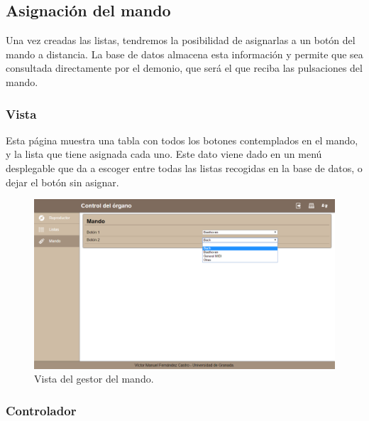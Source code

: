 \smallskip

\subsection{Asignación del mando}

Una vez creadas las listas, tendremos la posibilidad de asignarlas a un botón del mando a distancia. La base de datos almacena esta información y permite que sea consultada directamente por el demonio, que será el que reciba las pulsaciones del mando.

\subsubsection{Vista}

Esta página muestra una tabla con todos los botones contemplados en el mando, y la lista que tiene asignada cada uno. Este dato viene dado en un menú desplegable que da a escoger entre todas las listas recogidas en la base de datos, o dejar el botón sin asignar.

\smallskip

\begin{figure}[H]
	\noindent \begin{centering}
		\includegraphics[width=\linewidth*3/4]{capitulo5/cap_mando}
		\par\end{centering}
	\smallskip
	\caption{\label{fig:cap_mando} Vista del gestor del mando.}
\end{figure} 

\smallskip

\subsubsection{Controlador}

